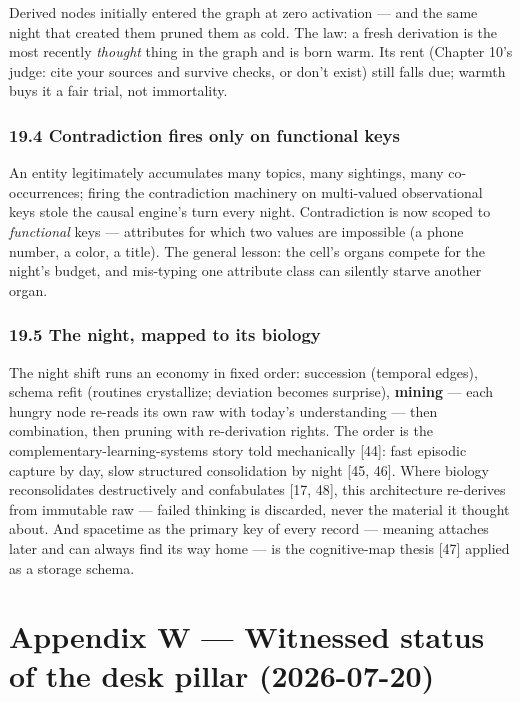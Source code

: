 Derived nodes initially entered the graph at zero activation --- and the same
night that created them pruned them as cold. The law: a fresh derivation is
the most recently \emph{thought} thing in the graph and is born warm. Its rent
(Chapter 10's judge: cite your sources and survive checks, or don't exist)
still falls due; warmth buys it a fair trial, not immortality.

\subsection{19.4 Contradiction fires only on functional keys}\label{contradiction-fires-only-on-functional-keys}

An entity legitimately accumulates many topics, many sightings, many
co-occurrences; firing the contradiction machinery on multi-valued
observational keys stole the causal engine's turn every night. Contradiction
is now scoped to \emph{functional} keys --- attributes for which two values are
impossible (a phone number, a color, a title). The general lesson: the cell's
organs compete for the night's budget, and mis-typing one attribute class can
silently starve another organ.

\subsection{19.5 The night, mapped to its biology}\label{the-night-mapped-to-its-biology}

The night shift runs an economy in fixed order: succession (temporal edges),
schema refit (routines crystallize; deviation becomes surprise), \textbf{mining} ---
each hungry node re-reads its own raw with today's understanding --- then
combination, then pruning with re-derivation rights. The order is the
complementary-learning-systems story told mechanically {[}44{]}: fast episodic
capture by day, slow structured consolidation by night {[}45, 46{]}. Where
biology reconsolidates destructively and confabulates {[}17, 48{]}, this
architecture re-derives from immutable raw --- failed thinking is discarded,
never the material it thought about. And spacetime as the primary key of every
record --- meaning attaches later and can always find its way home --- is the
cognitive-map thesis {[}47{]} applied as a storage schema.

\chapter*{Appendix W --- Witnessed status of the desk pillar (2026-07-20)}\label{appendix-w-witnessed-status-of-the-desk-pillar-2026-07-20}

